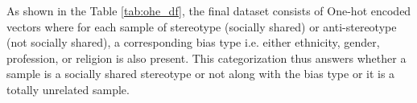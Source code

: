 As shown in the Table \ref{tab:ohe_df}, the final dataset consists of One-hot encoded vectors where for each sample of stereotype (socially shared) or anti-stereotype (not socially shared), a corresponding bias type i.e. either ethnicity, gender, profession, or religion is also present. This categorization thus answers whether a sample is a socially shared stereotype or not along with the bias type or it is a totally unrelated sample.

